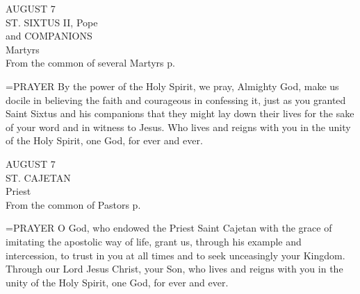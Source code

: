\begin{center}\normalsize AUGUST 7\\
\footnotesize ST. SIXTUS II, Pope\\
\footnotesize and COMPANIONS\\
\footnotesize Martyrs\\
\footnotesize From the common of several Martyrs p. \\
\end{center}

\hangindent=\parindent \small{PRAYER 
By the power of the Holy Spirit,
we pray, Almighty God,
make us docile in believing the faith
and courageous in confessing it,
just as you granted Saint Sixtus and his companions
that they might lay down their lives
for the sake of your word and in witness to Jesus.
Who lives and reigns with you in the unity of the Holy Spirit,
one God, for ever and ever.\\}
 
\begin{center}\normalsize AUGUST 7\\
\footnotesize ST. CAJETAN\\
\footnotesize Priest\\
\footnotesize From the common of Pastors p. \\
\end{center}

\hangindent=\parindent \small{PRAYER 
O God, who endowed the Priest Saint Cajetan
with the grace of imitating
the apostolic way of life,
grant us, through his example and intercession,
to trust in you at all times
and to seek unceasingly your Kingdom.
Through our Lord Jesus Christ, your Son,
who lives and reigns with you in the unity of the Holy Spirit,
one God, for ever and ever.\\}
 
